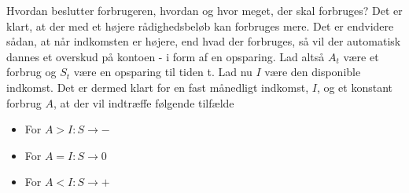 















































\iffalse













  
Hvordan beslutter forbrugeren, hvordan og hvor meget, der skal forbruges? Det er klart, at der med et højere rådighedsbeløb kan forbruges mere. Det er endvidere sådan, at når indkomsten er højere, end hvad der forbruges, så vil der automatisk dannes et overskud på kontoen - i form af en opsparing.
Lad altså $A_t$ være et forbrug og $S_t$ være en opsparing til tiden t.
Lad nu $I$ være den disponible indkomst.
Det er dermed klart for en fast månedligt indkomst, $I$, og et konstant forbrug $A$, at der vil indtræffe følgende tilfælde
\begin{itemize}
    \item For $A > I : S \to - $
    \item For $A = I : S \to 0$
    \item For $A < I : S \to +$
\end{itemize}

